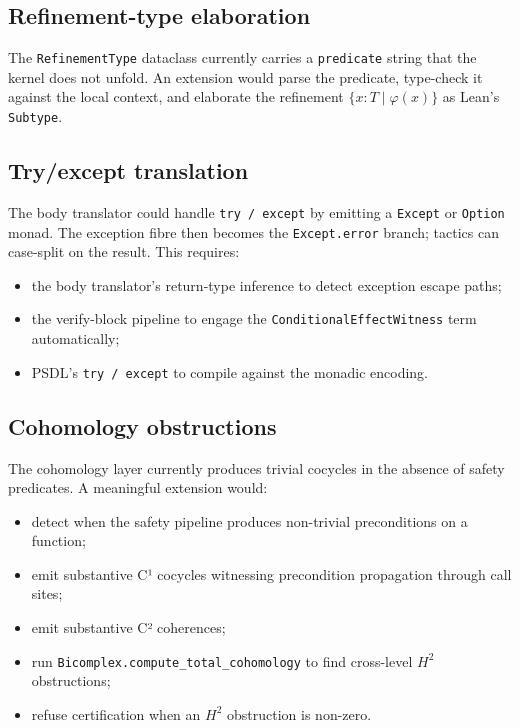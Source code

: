 \subsection{Refinement-type elaboration}

The \texttt{RefinementType} dataclass currently carries a
\texttt{predicate} string that the kernel does not unfold.  An
extension would parse the predicate, type-check it against the
local context, and elaborate the refinement
$\{x : T \mid \varphi(x)\}$ as Lean's \texttt{Subtype}.

\subsection{Try/except translation}

The body translator could handle \texttt{try / except} by emitting
a \Lean{} \texttt{Except} or \texttt{Option} monad.  The exception
fibre then becomes the \texttt{Except.error} branch; tactics can
case-split on the result.  This requires:
\begin{itemize}[leftmargin=1.7em]
  \item the body translator's return-type inference to detect
    exception escape paths;
  \item the verify-block pipeline to engage the
    \texttt{ConditionalEffectWitness} term automatically;
  \item PSDL's \texttt{try / except} to compile against the
    monadic encoding.
\end{itemize}

\subsection{Cohomology obstructions}

The cohomology layer currently produces trivial cocycles in the
absence of safety predicates.  A meaningful extension would:
\begin{itemize}[leftmargin=1.7em]
  \item detect when the safety pipeline produces non-trivial
    preconditions on a function;
  \item emit substantive C¹ cocycles witnessing precondition
    propagation through call sites;
  \item emit substantive C² coherences;
  \item run \texttt{Bicomplex.compute\_total\_cohomology} to find
    cross-level $H^2$ obstructions;
  \item refuse certification when an $H^2$ obstruction is non-zero.
\end{itemize}

